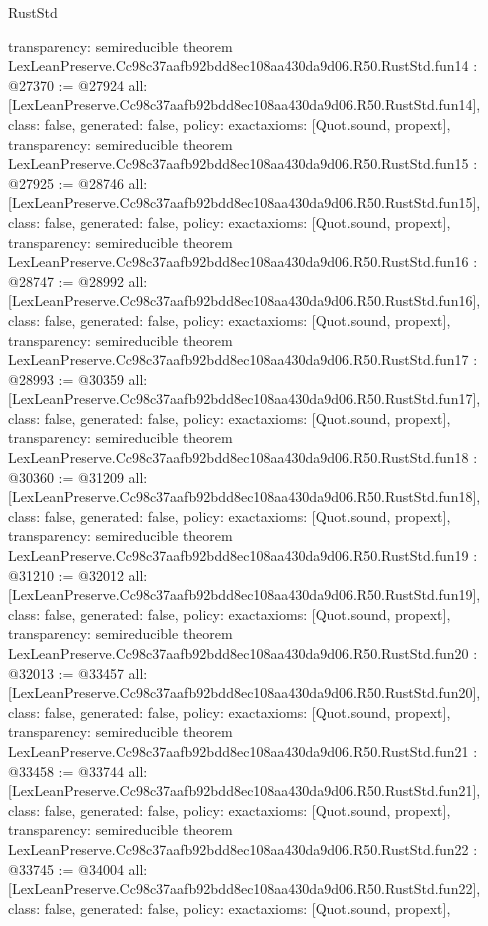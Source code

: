 \begin{lexlean}{RustStd}
\begin{coremodule}
{  transparency: semireducible
}
theorem LexLeanPreserve.Cc98c37aafb92bdd8ec108aa430da9d06.R50.RustStd.fun14 : @27370 := @27924 {
  all: [LexLeanPreserve.Cc98c37aafb92bdd8ec108aa430da9d06.R50.RustStd.fun14],
  class: false,
  generated: false,
  policy: exact{axioms: [Quot.sound, propext]},
  transparency: semireducible
}
theorem LexLeanPreserve.Cc98c37aafb92bdd8ec108aa430da9d06.R50.RustStd.fun15 : @27925 := @28746 {
  all: [LexLeanPreserve.Cc98c37aafb92bdd8ec108aa430da9d06.R50.RustStd.fun15],
  class: false,
  generated: false,
  policy: exact{axioms: [Quot.sound, propext]},
  transparency: semireducible
}
theorem LexLeanPreserve.Cc98c37aafb92bdd8ec108aa430da9d06.R50.RustStd.fun16 : @28747 := @28992 {
  all: [LexLeanPreserve.Cc98c37aafb92bdd8ec108aa430da9d06.R50.RustStd.fun16],
  class: false,
  generated: false,
  policy: exact{axioms: [Quot.sound, propext]},
  transparency: semireducible
}
theorem LexLeanPreserve.Cc98c37aafb92bdd8ec108aa430da9d06.R50.RustStd.fun17 : @28993 := @30359 {
  all: [LexLeanPreserve.Cc98c37aafb92bdd8ec108aa430da9d06.R50.RustStd.fun17],
  class: false,
  generated: false,
  policy: exact{axioms: [Quot.sound, propext]},
  transparency: semireducible
}
theorem LexLeanPreserve.Cc98c37aafb92bdd8ec108aa430da9d06.R50.RustStd.fun18 : @30360 := @31209 {
  all: [LexLeanPreserve.Cc98c37aafb92bdd8ec108aa430da9d06.R50.RustStd.fun18],
  class: false,
  generated: false,
  policy: exact{axioms: [Quot.sound, propext]},
  transparency: semireducible
}
theorem LexLeanPreserve.Cc98c37aafb92bdd8ec108aa430da9d06.R50.RustStd.fun19 : @31210 := @32012 {
  all: [LexLeanPreserve.Cc98c37aafb92bdd8ec108aa430da9d06.R50.RustStd.fun19],
  class: false,
  generated: false,
  policy: exact{axioms: [Quot.sound, propext]},
  transparency: semireducible
}
theorem LexLeanPreserve.Cc98c37aafb92bdd8ec108aa430da9d06.R50.RustStd.fun20 : @32013 := @33457 {
  all: [LexLeanPreserve.Cc98c37aafb92bdd8ec108aa430da9d06.R50.RustStd.fun20],
  class: false,
  generated: false,
  policy: exact{axioms: [Quot.sound, propext]},
  transparency: semireducible
}
theorem LexLeanPreserve.Cc98c37aafb92bdd8ec108aa430da9d06.R50.RustStd.fun21 : @33458 := @33744 {
  all: [LexLeanPreserve.Cc98c37aafb92bdd8ec108aa430da9d06.R50.RustStd.fun21],
  class: false,
  generated: false,
  policy: exact{axioms: [Quot.sound, propext]},
  transparency: semireducible
}
theorem LexLeanPreserve.Cc98c37aafb92bdd8ec108aa430da9d06.R50.RustStd.fun22 : @33745 := @34004 {
  all: [LexLeanPreserve.Cc98c37aafb92bdd8ec108aa430da9d06.R50.RustStd.fun22],
  class: false,
  generated: false,
  policy: exact{axioms: [Quot.sound, propext]},
}
\end{coremodule}
\end{lexlean}
